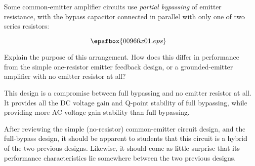 

Some common-emitter amplifier circuits use {\it partial bypassing} of emitter resistance, with the bypass capacitor connected in parallel with only one of two series resistors:

$$\epsfbox{00966x01.eps}$$

Explain the purpose of this arrangement.  How does this differ in performance from the simple one-resistor emitter feedback design, or a grounded-emitter amplifier with no emitter resistor at all?







This design is a compromise between full bypassing and no emitter resistor at all.  It provides all the DC voltage gain and Q-point stability of full bypassing, while providing more AC voltage gain stability than full bypassing.







After reviewing the simple (no-resistor) common-emitter circuit design, and the full-bypass design, it should be apparent to students that this circuit is a hybrid of the two previous designs.  Likewise, it should come as little surprise that its performance characteristics lie somewhere between the two previous designs.




